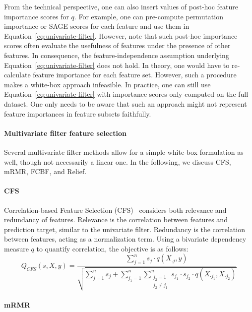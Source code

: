 \documentclass{article}
\theoremstyle{definition}
\begin{document}
From the technical perspective, one can also insert values of post-hoc feature importance scores for $q$.
For example, one can pre-compute permutation importance or SAGE scores for each feature and use them in Equation~\ref{eq:univariate-filter}.
However, note that such post-hoc importance scores often evaluate the usefulness of features under the presence of other features.
In consequence, the feature-independence assumption underlying Equation~\ref{eq:univariate-filter} does not hold.
In theory, one would have to re-calculate feature importance for each feature set.
However, such a procedure makes a white-box approach infeasible.
In practice, one can still use Equation~\ref{eq:univariate-filter} with importance scores only computed on the full dataset.
One only needs to be aware that such an approach might not represent feature importances in feature subsets faithfully.

\paragraph{Multivariate filter feature selection}

Several multivariate filter methods allow for a simple white-box formulation as well, though not necessarily a linear one.
In the following, we discuss CFS, mRMR, FCBF, and Relief.

\paragraph{CFS}

Correlation-based Feature Selection (CFS)~\cite{hall1999correlation} considers both relevance and redundancy of features.
Relevance is the correlation between features and prediction target, similar to the univariate filter.
Redundancy is the correlation between features, acting as a normalization term.
Using a bivariate dependency measure $q$ to quantify correlation, the objective is as follows:
%
\begin{equation}
	Q_{CFS}(s,X,y) = \frac{\sum_{j=1}^{n} s_j \cdot q(X_{\cdot{}j},y)}{\sqrt{\sum_{j=1}^{n} s_j + \sum_{j_1=1}^{n} \sum_{\substack{j_2=1 \\ j_2 \neq j_1}}^{n} s_{j_1} \cdot s_{j_2} \cdot q(X_{\cdot{}j_1}, X_{\cdot{}j_2})}}
	\label{eq:cfs}
\end{equation}
%
\paragraph{mRMR}
\end{document}
